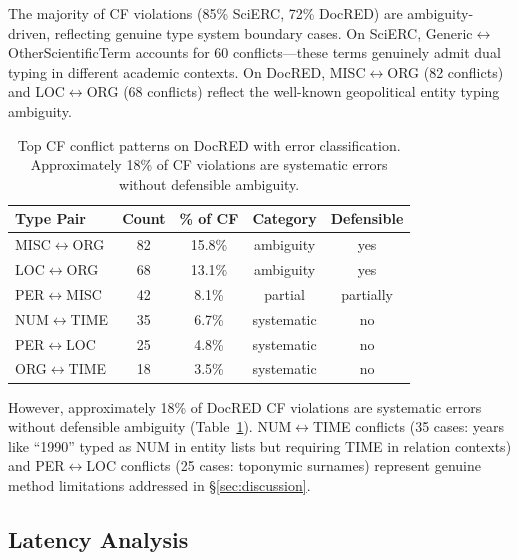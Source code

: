 \documentclass[11pt,a4paper]{article}
\begin{document}
The majority of CF violations (85\% SciERC, 72\% DocRED) are ambiguity-driven, reflecting genuine type system boundary cases.
On SciERC, Generic$\leftrightarrow$OtherScientificTerm accounts for 60 conflicts---these terms genuinely admit dual typing in different academic contexts.
On DocRED, MISC$\leftrightarrow$ORG (82 conflicts) and LOC$\leftrightarrow$ORG (68 conflicts) reflect the well-known geopolitical entity typing ambiguity.

\begin{table}[t]
\centering
\small
\begin{tabular}{lcccc}
\toprule
\textbf{Type Pair} & \textbf{Count} & \textbf{\% of CF} & \textbf{Category} & \textbf{Defensible} \\
\midrule
MISC$\leftrightarrow$ORG & 82 & 15.8\% & ambiguity & yes \\
LOC$\leftrightarrow$ORG & 68 & 13.1\% & ambiguity & yes \\
PER$\leftrightarrow$MISC & 42 & 8.1\% & partial & partially \\
NUM$\leftrightarrow$TIME & 35 & 6.7\% & systematic & no \\
PER$\leftrightarrow$LOC & 25 & 4.8\% & systematic & no \\
ORG$\leftrightarrow$TIME & 18 & 3.5\% & systematic & no \\
\bottomrule
\end{tabular}
\caption{Top CF conflict patterns on DocRED with error classification. Approximately 18\% of CF violations are systematic errors without defensible ambiguity.}
\label{tab:docred-cf-patterns}
\end{table}

However, approximately 18\% of DocRED CF violations are systematic errors without defensible ambiguity (Table~\ref{tab:docred-cf-patterns}).
NUM$\leftrightarrow$TIME conflicts (35 cases: years like ``1990'' typed as NUM in entity lists but requiring TIME in relation contexts) and PER$\leftrightarrow$LOC conflicts (25 cases: toponymic surnames) represent genuine method limitations addressed in \S\ref{sec:discussion}.

\subsection{Latency Analysis}
\end{document}
